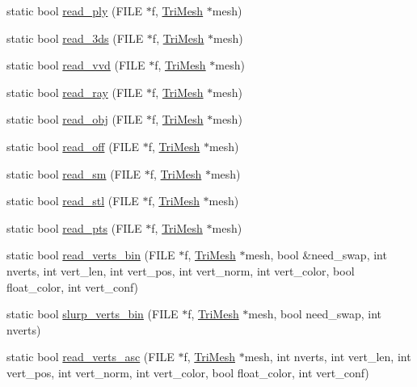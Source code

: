\begin{DoxyCompactItemize}
static bool \hyperlink{namespacetrimesh_ad0cf7ab06d07c0569c9a7eb832ff114a}{read\+\_\+ply} (F\+I\+LE $\ast$f, \hyperlink{classtrimesh_1_1TriMesh}{Tri\+Mesh} $\ast$mesh)
\item 
static bool \hyperlink{namespacetrimesh_af87e720574f2b83f4a1f8cb94231d676}{read\+\_\+3ds} (F\+I\+LE $\ast$f, \hyperlink{classtrimesh_1_1TriMesh}{Tri\+Mesh} $\ast$mesh)
\item 
static bool \hyperlink{namespacetrimesh_a388de28d8189208fbaa377ffedc14cb8}{read\+\_\+vvd} (F\+I\+LE $\ast$f, \hyperlink{classtrimesh_1_1TriMesh}{Tri\+Mesh} $\ast$mesh)
\item 
static bool \hyperlink{namespacetrimesh_a8a73e582eb0a3e4df256a4eb7e226cff}{read\+\_\+ray} (F\+I\+LE $\ast$f, \hyperlink{classtrimesh_1_1TriMesh}{Tri\+Mesh} $\ast$mesh)
\item 
static bool \hyperlink{namespacetrimesh_a6f5afaf75436495bf724248ceba4eab7}{read\+\_\+obj} (F\+I\+LE $\ast$f, \hyperlink{classtrimesh_1_1TriMesh}{Tri\+Mesh} $\ast$mesh)
\item 
static bool \hyperlink{namespacetrimesh_ace7124de1320b844bbf3f353f6dfab9a}{read\+\_\+off} (F\+I\+LE $\ast$f, \hyperlink{classtrimesh_1_1TriMesh}{Tri\+Mesh} $\ast$mesh)
\item 
static bool \hyperlink{namespacetrimesh_a0a31a91f293a9ead6c5c3f87e5e234dc}{read\+\_\+sm} (F\+I\+LE $\ast$f, \hyperlink{classtrimesh_1_1TriMesh}{Tri\+Mesh} $\ast$mesh)
\item 
static bool \hyperlink{namespacetrimesh_acbe4673a2ddcbb3b2ec550b7f16b8f2c}{read\+\_\+stl} (F\+I\+LE $\ast$f, \hyperlink{classtrimesh_1_1TriMesh}{Tri\+Mesh} $\ast$mesh)
\item 
static bool \hyperlink{namespacetrimesh_a964f33d0b4d230bcdab3f3fc73946fa7}{read\+\_\+pts} (F\+I\+LE $\ast$f, \hyperlink{classtrimesh_1_1TriMesh}{Tri\+Mesh} $\ast$mesh)
\item 
static bool \hyperlink{namespacetrimesh_a89396ced1b73814bb870a9541b94b9d4}{read\+\_\+verts\+\_\+bin} (F\+I\+LE $\ast$f, \hyperlink{classtrimesh_1_1TriMesh}{Tri\+Mesh} $\ast$mesh, bool \&need\+\_\+swap, int nverts, int vert\+\_\+len, int vert\+\_\+pos, int vert\+\_\+norm, int vert\+\_\+color, bool float\+\_\+color, int vert\+\_\+conf)
\item 
static bool \hyperlink{namespacetrimesh_aff82fb96a67444ad578b0d83579b4f31}{slurp\+\_\+verts\+\_\+bin} (F\+I\+LE $\ast$f, \hyperlink{classtrimesh_1_1TriMesh}{Tri\+Mesh} $\ast$mesh, bool need\+\_\+swap, int nverts)
\item 
static bool \hyperlink{namespacetrimesh_abcd71712bff6c4ee8c3fc4627ed6a292}{read\+\_\+verts\+\_\+asc} (F\+I\+LE $\ast$f, \hyperlink{classtrimesh_1_1TriMesh}{Tri\+Mesh} $\ast$mesh, int nverts, int vert\+\_\+len, int vert\+\_\+pos, int vert\+\_\+norm, int vert\+\_\+color, bool float\+\_\+color, int vert\+\_\+conf)

\end{DoxyCompactItemize}
